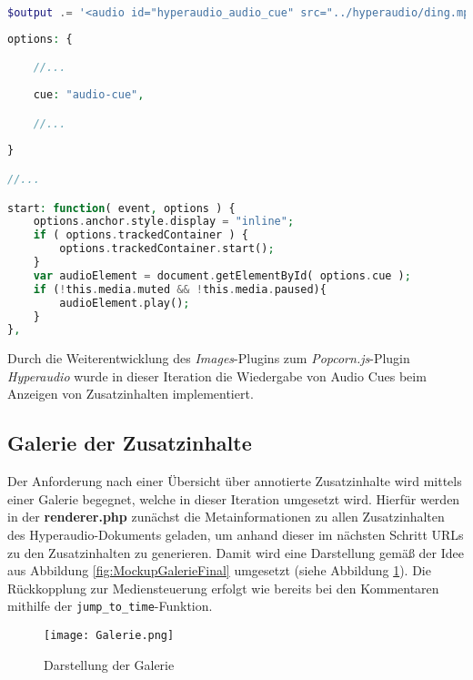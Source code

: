 \begin{lstlisting}[language=php,
             linewidth=\textwidth,
             caption={Ausschnitt der \textbf{renderer.php} in der 7. Iteration},
             label={lst:it7:renderer}]
$output .= '<audio id="hyperaudio_audio_cue" src="../hyperaudio/ding.mp3"></audio>';
\end{lstlisting}

\begin{lstlisting}[language=php,
             linewidth=\textwidth,
             caption={Ausschnitt der \textbf{popcorn.hyperaudio.js} in der 7. Iteration},
             label={lst:it7:popcorn.hyperaudio}]
options: {

    //...
    
    cue: "audio-cue",

    //...    
    
}

//...

start: function( event, options ) {
    options.anchor.style.display = "inline";
    if ( options.trackedContainer ) {
        options.trackedContainer.start();
    }
    var audioElement = document.getElementById( options.cue );
    if (!this.media.muted && !this.media.paused){
        audioElement.play();
    }
},
\end{lstlisting}

Durch die Weiterentwicklung des \textit{Images}-Plugins zum \textit{Popcorn.js}-Plugin \textit{Hyperaudio} wurde in dieser Iteration die Wiedergabe von Audio Cues beim Anzeigen von Zusatzinhalten implementiert.

\subsection{Galerie der Zusatzinhalte}
Der Anforderung nach einer Übersicht über annotierte Zusatzinhalte wird mittels einer Galerie begegnet, welche in dieser Iteration umgesetzt wird. Hierfür werden in der \textbf{renderer.php} zunächst die Metainformationen zu allen Zusatzinhalten des Hyperaudio-Dokuments geladen, um anhand dieser im nächsten Schritt URLs zu den Zusatzinhalten zu generieren. Damit wird eine Darstellung gemäß der Idee aus Abbildung \ref{fig:MockupGalerieFinal} umgesetzt (siehe Abbildung \ref{fig:Galerie}). Die Rückkopplung zur Mediensteuerung erfolgt wie bereits bei den Kommentaren mithilfe der \texttt{jump_to_time}-Funktion.

\begin{figure}[h!]
\texttt{[image: Galerie.png]}
\caption{\label{fig:Galerie}Darstellung der Galerie}
\end{figure}

